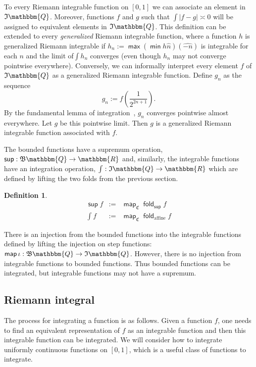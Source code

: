 \documentclass{elsarticle}
\newcommand{\assign}{:=}
\newcommand{\tmem}[1]{{\em #1\/}}
\newcommand{\tmop}[1]{\ensuremath{\operatorname{#1}}}
\newcommand{\um}{-}
\newtheorem{definition}{Definition}
\newcommand{\defEq}{\ensuremath{\assign}}
\newcommand{\arr}{\ensuremath{\rightarrow}}
\newcommand{\C}{\ensuremath{\mathfrak{C}}}
\newcommand{\uc}{uniformly continuous}
\newcommand{\lift}[1]{\ensuremath{\fastMap  #1}}
\newcommand{\fastMap}{\ensuremath{\tmop{\mathsf{map}}}}
\newcommand{\R}{\ensuremath{\mathbbm{R}}}
\newcommand{\BF}{\ensuremath{\mathfrak{B}}}
\newcommand{\IF}{\ensuremath{\mathfrak{I}}}
\begin{document}
To every Riemann integrable function on $[0,1]$ we can associate
an element in $\IF \mathbbm{Q}$. Moreover, functions $f$ and $g$ such that
$\int |f - g| \asymp 0$ will be assigned to equivalent elements in $\IF
\mathbbm{Q}$. This definition can be extended to every {\tmem{generalized}}
Riemann integrable function, where a function $h$ is generalized Riemann
integrable if $h_n \defEq \mathsf{\max} \left( \mathsf{\min} h \hat{n} \right)
\left( \widehat{\um n} \right)$ is integrable for each $n$ and the limit
of$\int h_n$ converges (even though $h_n$ may not converge pointwise
everywhere). Conversely, we can informally interpret every element $f$ of $\IF
\mathbbm{Q}$ as a generalized Riemann integrable function. Define $g_n$ as the
sequence
\[ g_n \defEq f \left( \frac{1}{2^{2 n + 1}} \right) \text{.} \]
By the fundamental lemma of integration~{\cite{lang:1993}}, $g_n$ converges
pointwise almost everywhere. Let $g$ be this pointwise limit. Then $g$ is a
generalized Riemann integrable function associated with $f$.

The bounded functions have a supremum operation,
$\tmop{\mathsf{sup}}: \BF \mathbbm{Q} \arr \R$ and, similarly, the integrable
functions have an integration operation, $\int: \IF \mathbbm{Q} \rightarrow
\R$ which are defined by lifting the two folds from the previous section.

\begin{definition}\label{IntegralQ}
  \begin{eqnarray*}
    \tmop{\mathsf{sup}} f &  \defEq & \fastMap_{\C}  \tmop{\mathsf{fold}}_{\tmop{\mathsf{sup}}}
f\\
    \int f & \defEq & \fastMap_{\C}  \tmop{\mathsf{fold}}_{\tmop{affine}} f
  \end{eqnarray*}
\end{definition}

There is an injection from the bounded functions into the integrable functions
defined by lifting the injection on step functions: $\lift{\iota} : \BF
\mathbbm{Q} \rightarrow \IF \mathbbm{Q}$. However, there is no injection from
integrable functions to bounded functions. Thus bounded functions can be
integrated, but integrable functions may not have a supremum.

\subsection{Riemann integral}\label{ss:riemann}The process for integrating a
function is as follows. Given a function $f$, one needs to find an equivalent
representation of $f$ as an integrable function and then this integrable
function can be integrated. We will consider how to integrate {\uc} functions
on $[0,1]$, which is a useful class of functions to integrate.
\end{document}
